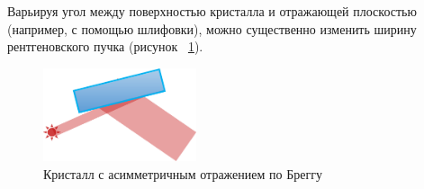 Варьируя угол между поверхностью кристалла и отражающей плоскостью (например, с помощью шлифовки),
можно существенно изменить ширину рентгеновского пучка (рисунок ~\ref{ris:assym_width_beam}).
\begin{figure}[H]
 \centering
 \includegraphics[width=0.4\textwidth]{images/assym_width_beam.png}
 \caption{Кристалл с асимметричным отражением по Бреггу}
 \label{ris:assym_width_beam}
\end{figure}
